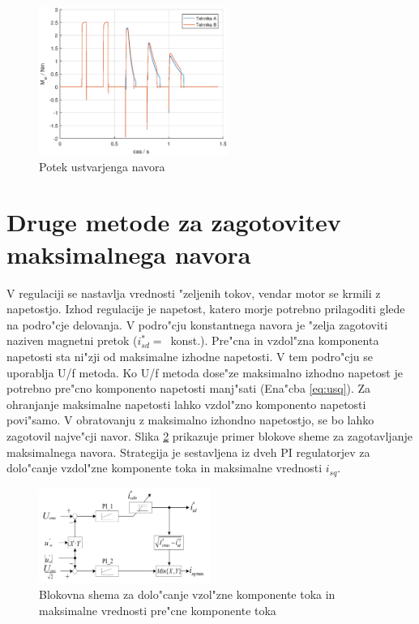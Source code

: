 \documentclass[journal,a4paper,twoside]{sty/IEEEtran}
\begin{document}
\begin{figure}
\includegraphics[width=0.55\textwidth]{fig_Mel.eps}
\caption{Potek ustvarjenga navora}
\label{fig:Mel}
\end{figure}

\section{Druge metode za zagotovitev maksimalnega navora}

V regulaciji se nastavlja vrednosti "zeljenih tokov, vendar motor se krmili z napetostjo. Izhod regulacije je napetost, katero morje potrebno prilagoditi glede na  podro"cje delovanja. V podro"cju konstantnega navora je "zelja zagotoviti naziven magnetni pretok ($i_{sd}^*=$~konst.).
Pre"cna in vzdol"zna komponenta napetosti sta ni"zji od maksimalne izhodne napetosti. V tem podro"cju se uporablja U/f metoda. \cite{servopogoni} Ko U/f metoda dose"ze maksimalno izhodno napetost je potrebno pre"cno komponento napetosti manj"sati (Ena"cba \ref{eq:usq}). Za ohranjanje maksimalne napetosti lahko vzdol"zno komponento napetosti povi"samo. V obratovanju z maksimalno izhondno napetostjo, se bo lahko zagotovil najve"cji navor. Slika \ref{fig:MTPA_strategy} prikazuje primer blokove sheme za zagotavljanje maksimalnega navora. Strategija je sestavljena iz dveh PI regulatorjev za dolo"canje vzdol"zne komponente toka in maksimalne vrednosti $i_{sq}$.

\begin{figure}
\includegraphics[width=0.5\textwidth]{MTPA_prva.png}
\caption{Blokovna shema za dolo"canje vzol"zne komponente toka in maksimalne vrednosti pre"cne komponente toka\cite{MTPA}}
\label{fig:MTPA_strategy}
\end{figure}
\end{document}
